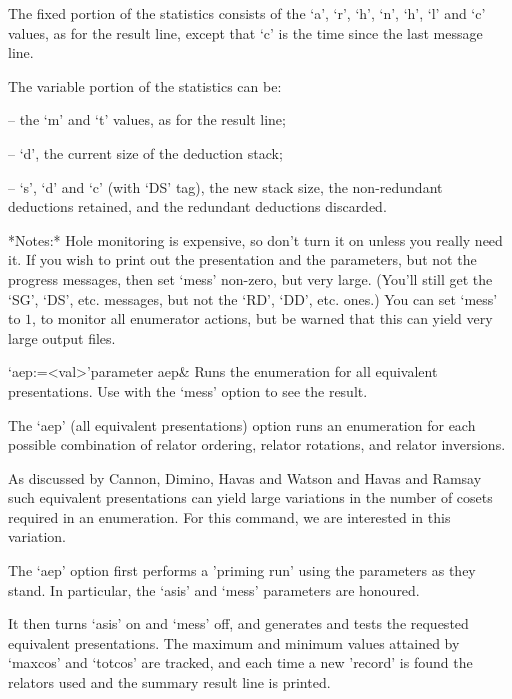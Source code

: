 The fixed  portion of  the statistics consists  of the `a',  `r', `h',
`n', `h', `l' and `c' values,  as for the result line, except that `c'
is the time since the last message line.

The variable portion of the statistics can be:

\beginitems

\item{--}  the `m' and `t' values, as for the result line;
\item{--}  `d', the current size of the deduction stack;
\item{--}  `s', `d' and `c' (with `DS' tag), the new stack size,
the non-redundant deductions retained, and the redundant deductions
discarded.

\enditems

*Notes:*
Hole monitoring  is expensive, so don't  turn it on  unless you really
need  it.   If  you  wish  to  print  out  the  presentation  and  the
parameters, but  not the progress messages, then  set `mess' non-zero,
but very large.  (You'll still  get the `SG', `DS', etc. messages, but
not the `RD', `DD', etc. ones.)  You can set `mess' to $1$, to monitor
all enumerator actions,  but be warned that this  can yield very large
output files.





\beginitems

\>`aep:=<val>'{parameter aep}&
Runs the enumeration for all equivalent presentations. Use with the `mess'
option to see the result.

\enditems

The `aep'  (all equivalent  presentations) option runs  an enumeration
for each possible combination  of relator ordering, relator rotations,
and relator inversions.

As discussed by Cannon, Dimino, Havas and Watson \cite{CDHW} and Havas
and Ramsay  \cite{HR1} such  equivalent presentations can  yield large
variations in  the number of  cosets required in an  enumeration.  For
this command, we are interested in this variation.

The `aep' option  first performs a 'priming run'  using the parameters
as they  stand.  In particular,  the `asis' and `mess'  parameters are
honoured.

It then  turns `asis' on and  `mess' off, and generates  and tests the
requested  equivalent presentations.  The  maximum and  minimum values
attained by  `maxcos' and  `totcos' are tracked,  and each time  a new
'record' is  found the  relators used and  the summary result  line is
printed.

